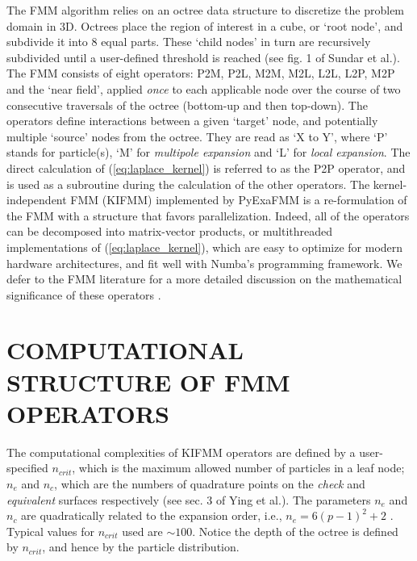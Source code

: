 \documentclass{IEEEcsmag}
\begin{document}
The FMM algorithm relies on an octree data structure to discretize the problem domain in 3D. Octrees place the region of interest in a cube, or `root node', and subdivide it into 8 equal parts. These `child nodes' in turn are recursively subdivided until a user-defined threshold is reached (see fig. 1 of Sundar et al.\cite{Sundar2007}). The FMM consists of eight operators: P2M, P2L, M2M, M2L, L2L, L2P, M2P and the `near field', applied \textit{once} to each applicable node over the course of two consecutive traversals of the octree (bottom-up and then top-down). The operators define interactions between a given `target' node, and potentially multiple `source' nodes from the octree. They are read as `X to Y', where `P' stands for particle(s), `M' for \textit{multipole expansion} and `L' for \textit{local expansion}. The direct calculation of (\ref{eq:laplace_kernel}) is referred to as the P2P operator, and is used as a subroutine during the calculation of the other operators. The kernel-independent FMM (KIFMM) \cite{Ying2004} implemented by PyExaFMM is a re-formulation of the FMM with a structure that favors parallelization. Indeed, all of the operators can be decomposed into matrix-vector products, or multithreaded implementations of (\ref{eq:laplace_kernel}), which are easy to optimize for modern hardware architectures, and fit well with Numba's programming framework. We defer to the FMM literature for a more detailed discussion on the mathematical significance of these operators \cite{Ying2004,Greengard1987}.

\section{COMPUTATIONAL STRUCTURE OF FMM OPERATORS}

The computational complexities of KIFMM operators are defined by a user-specified $n_{crit}$, which is the maximum allowed number of particles in a leaf node; $n_e$ and $n_c$, which are the numbers of quadrature points on the \textit{check} and \textit{equivalent} surfaces respectively (see sec. 3 of Ying et al.\cite{Ying2004}). The parameters $n_e$ and $n_c$ are quadratically related to the expansion order, i.e., $n_e = 6(p-1)^2 + 2$ \cite{Ying2004}. Typical values for $n_{crit}$ used are $\sim 100$. Notice the depth of the octree is defined by $n_{crit}$, and hence by the particle distribution.
\end{document}
